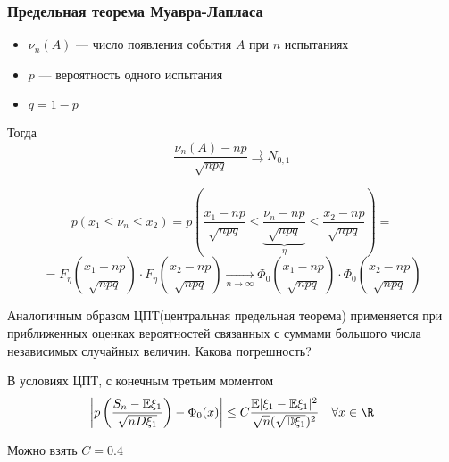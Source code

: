 \subsubsection{Предельная теорема Муавра-Лапласа}

\begin{theorem}\itemfix
    \begin{itemize}
        \item \(\nu_n(A)\) --- число появления события \(A\) при \(n\) испытаниях
        \item \(p\) --- вероятность одного испытания
        \item \(q = 1 - p\)
    \end{itemize}
    Тогда
    \[ \frac{\nu_n(A) - np}{\sqrt{npq}}\rightrightarrows N_{0,1} \]
\end{theorem}
\begin{corollary}
    \[p(x_1 \le \nu_n \le x_2) = p\left(\frac{x_1 - np}{\sqrt{npq}} \le \underbrace{\frac{\nu_n - np}{\sqrt{npq}}}_\eta \le \frac{x_2 - np}{\sqrt{npq}} \right) = \]
    \[ = F_\eta\left(\frac{x_1 - np}{\sqrt{npq}}\right)\cdot F_\eta\left(\frac{x_2 - np}{\sqrt{npq}}\right) \xrightarrow[n \to \infty]{} \Phi_0\left(\frac{x_1 - np}{\sqrt{npq}}\right) \cdot \Phi_0\left(\frac{x_2 - np}{\sqrt{npq}}\right)\]
\end{corollary}
\begin{remark}
    Аналогичным образом ЦПТ(центральная предельная теорема) применяется при приближенных оценках вероятностей связанных с суммами большого числа независимых случайных величин. Какова погрешность?
\end{remark}
\begin{theorem}
    В условиях ЦПТ, \? с конечным третьим моментом
    \[ \left| p\left( \frac{S_n - \mathbb{E}\xi_1}{\sqrt{nD\xi_1}} \right) - \Phi_0(x) \right| \le C \frac{\mathbb{E}|\xi_1 - \mathbb{E}\xi_1|^2}{\sqrt{n}(\sqrt{\mathbb{D}\xi_1})^2} \quad \forall x \in \R \]
\end{theorem}
\begin{remark}
    Можно взять \(C = 0.4\)
\end{remark}
